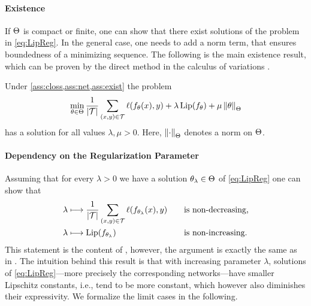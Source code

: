 \paragraph{Existence} If $\Theta$ is compact or finite, one can show that there exist solutions of the problem in \cref{eq:LipReg}. In the general case, one needs to add a norm term, that ensures boundedness of a minimizing sequence. The following is the main existence result, which can be proven by the direct method in the calculus of variations \cite{dacorogna2007direct}.
%
\begin{proposition}{\cite[Prop. 1]{bungert2021clip}}{}
Under \cref{ass:closs,ass:net,ass:exist} the problem
\begin{align*}
\min_{\theta\in\Theta}
\frac{1}{\left|\mathcal{T}\right|}
\sum_{(x,y)\in\mathcal{T}}
\ell(f_\theta(x),y) + 
\lambda\operatorname{Lip}(f_\theta) + \mu\left\|\theta\right\|_\Theta
\end{align*}
has a solution for all values $\lambda,\mu>0$.
Here, $\left\|\cdot\right\|_\Theta$ denotes a norm on $\Theta$.
\end{proposition}
%
%
\paragraph{Dependency on the Regularization Parameter} Assuming that for every $\lambda>0$ we have a solution $\theta_\lambda\in\Theta$ of \cref{eq:LipReg} one can show that
%
\begin{alignat*}{2}
\lambda&\longmapsto
\frac{1}{\left|\mathcal{T}\right|}
\sum_{(x,y)\in\mathcal{T}}\ell(f_{\theta_\lambda}(x),y) \quad&&\text{is non-decreasing,}
\\
\lambda&\longmapsto\operatorname{Lip}(f_{\theta_{\lambda}}) 
\quad&&\text{is non-increasing.}
\end{alignat*}
%
%
This statement is the content of \cite[Prop. 2]{bungert2021clip}, however, the argument is exactly the same as in \cite{burger2013guide}. The intuition behind this result is that with increasing parameter $\lambda$, solutions of \cref{eq:LipReg}---more precisely the corresponding networks---have smaller Lipschitz constants, i.e., tend to be more constant, which however also diminishes their expressivity. We formalize the limit cases in the following.

